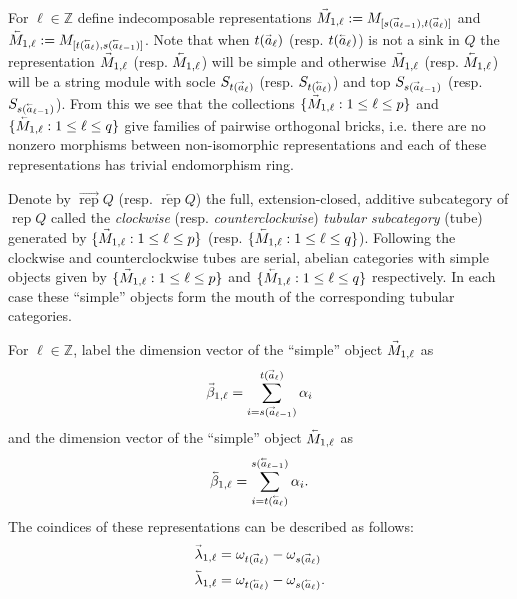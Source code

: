 \documentclass[11pt]{amsart}
\newcommand{\ZZ}{\mathbb{Z}}
\newcommand{\rep}{\operatorname{rep}}
\renewcommand{\vec}[1]{\accentset{\shortrightarrow}{#1}}
\newcommand{\cev}[1]{\accentset{\shortleftarrow}{#1}}
\numberwithin{equation}{section}
\begin{document}
  For $\ell\in\ZZ$ define indecomposable representations $\vec{M}_{1,\ell}:=M_{[s(\vec{a}_{\ell-1}),t(\vec{a}_\ell)]}$ and $\cev{M}_{1,\ell}:=M_{[t(\cev{a}_\ell),s(\cev{a}_{\ell-1})]}$.  Note that when $t(\vec{a}_\ell)$ (resp. $t(\cev{a}_\ell)$) is not a sink in $Q$ the representation $\vec{M}_{1,\ell}$ (resp. $\cev{M}_{1,\ell}$) will be simple and otherwise $\vec{M}_{1,\ell}$ (resp. $\cev{M}_{1,\ell}$) will be a string module with socle $S_{t(\vec{a}_\ell)}$ (resp. $S_{t(\cev{a}_\ell)}$) and top $S_{s(\vec{a}_{\ell-1})}$ (resp. $S_{s(\cev{a}_{\ell-1})}$).  From this we see that the collections $\{\vec{M}_{1,\ell}:1\le\ell\le p\}$ and $\{\cev{M}_{1,\ell}:1\le\ell\le q\}$ give families of pairwise orthogonal bricks, i.e. there are no nonzero morphisms between non-isomorphic representations and each of these representations has trivial endomorphism ring.

  Denote by $\overrightarrow{\rep}Q$ (resp. $\overleftarrow{\rep}Q$) the full, extension-closed, additive subcategory of $\rep Q$ called the \emph{clockwise} (resp. \emph{counterclockwise}) \emph{tubular subcategory} (tube) generated by $\{\vec{M}_{1,\ell}:1\le\ell\le p\}$ (resp. $\{\cev{M}_{1,\ell}:1\le\ell\le q\}$).  Following \cite[Section 3.1]{Rin84} the clockwise and counterclockwise tubes are serial, abelian categories with simple objects given by $\{\vec{M}_{1,\ell}:1\le\ell\le p\}$ and $\{\cev{M}_{1,\ell}:1\le\ell\le q\}$ respectively.  In each case these ``simple'' objects form the mouth of the corresponding tubular categories.

  For $\ell\in\ZZ$, label the dimension vector of the ``simple'' object $\vec{M}_{1,\ell}$ as
  \begin{equation}
    \vec{\beta}_{1,\ell}=\sum_{i=s(\vec{a}_{\ell-1})}^{t(\vec{a}_\ell)}\alpha_i
  \end{equation}
  and the dimension vector of the ``simple'' object $\cev{M}_{1,\ell}$ as
  \begin{equation}
    \cev{\beta}_{1,\ell}=\sum_{i=t(\cev{a}_\ell)}^{s(\cev{a}_{\ell-1})}\alpha_i.
  \end{equation}
  The coindices of these representations can be described as follows:
  \begin{align}
    \vec{\lambda}_{1,\ell}&=\omega_{t(\vec{a}_\ell)}-\omega_{s(\vec{a}_\ell)}\\
    \cev{\lambda}_{1,\ell}&=\omega_{t(\cev{a}_\ell)}-\omega_{s(\cev{a}_\ell)}.
  \end{align}
\end{document}
